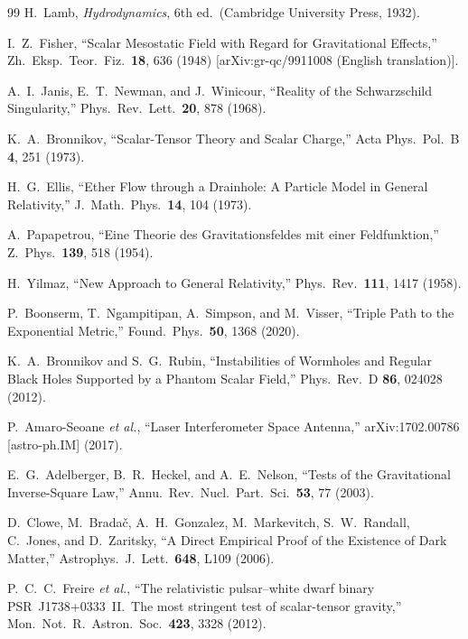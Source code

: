 \begin{thebibliography}{99}
H.~Lamb,
\textit{Hydrodynamics},
6th ed.\ (Cambridge University Press, 1932).

I.~Z.~Fisher,
``Scalar Mesostatic Field with Regard for Gravitational Effects,''
Zh.\ Eksp.\ Teor.\ Fiz.\ \textbf{18}, 636 (1948)
[arXiv:gr-qc/9911008 (English translation)].

A.~I.~Janis, E.~T.~Newman, and J.~Winicour,
``Reality of the Schwarzschild Singularity,''
Phys.\ Rev.\ Lett.\ \textbf{20}, 878 (1968).

K.~A.~Bronnikov,
``Scalar-Tensor Theory and Scalar Charge,''
Acta Phys.\ Pol.\ B \textbf{4}, 251 (1973).

H.~G.~Ellis,
``Ether Flow through a Drainhole: A Particle Model in General Relativity,''
J.\ Math.\ Phys.\ \textbf{14}, 104 (1973).

A.~Papapetrou,
``Eine Theorie des Gravitationsfeldes mit einer Feldfunktion,''
Z.\ Phys.\ \textbf{139}, 518 (1954).

H.~Yilmaz,
``New Approach to General Relativity,''
Phys.\ Rev.\ \textbf{111}, 1417 (1958).

P.~Boonserm, T.~Ngampitipan, A.~Simpson, and M.~Visser,
``Triple Path to the Exponential Metric,''
Found.\ Phys.\ \textbf{50}, 1368 (2020).

K.~A.~Bronnikov and S.~G.~Rubin,
``Instabilities of Wormholes and Regular Black Holes Supported by a Phantom Scalar Field,''
Phys.\ Rev.\ D \textbf{86}, 024028 (2012).

P.~Amaro-Seoane \textit{et al.},
``Laser Interferometer Space Antenna,''
arXiv:1702.00786 [astro-ph.IM] (2017).

E.~G.~Adelberger, B.~R.~Heckel, and A.~E.~Nelson,
``Tests of the Gravitational Inverse-Square Law,''
Annu.\ Rev.\ Nucl.\ Part.\ Sci.\ \textbf{53}, 77 (2003).

D.~Clowe, M.~Brada\v{c}, A.~H.~Gonzalez, M.~Markevitch,
S.~W.~Randall, C.~Jones, and D.~Zaritsky,
``A Direct Empirical Proof of the Existence of Dark Matter,''
Astrophys.\ J.\ Lett.\ \textbf{648}, L109 (2006).

P.~C.~C.~Freire \textit{et al.},
``The relativistic pulsar--white dwarf binary PSR~J1738+0333~II.\ The most stringent test of scalar-tensor gravity,''
Mon.\ Not.\ R.\ Astron.\ Soc.\ \textbf{423}, 3328 (2012).


\end{thebibliography}
